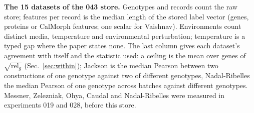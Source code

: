 \begin{table}[htbp]
\centering
\scriptsize
\setlength{\tabcolsep}{2.5pt}
\caption[]{\textbf{The 15 datasets of the 043 store.} Genotypes and records count the raw
store; features per record is the median length of the stored label vector (genes,
proteins or CalMorph features; one scalar for Vaishnav). Environments count distinct
media, temperature and environmental perturbation; temperature is a typed gap where the
paper states none. The last column gives each dataset's agreement with itself and the
statistic used: a ceiling is the mean over genes of $\sqrt{\mathrm{rel}_g}$
(Sec.~\ref{sec:within}); Jackson is the median Pearson between two constructions of one
genotype against two of different genotypes, Nadal-Ribelles the median Pearson of one
genotype across batches against different genotypes. Messner, Zelezniak, Ohya, Caudal and
Nadal-Ribelles were measured in experiments 019 and 028, before this store.}
\label{tab:store}

\end{table}
